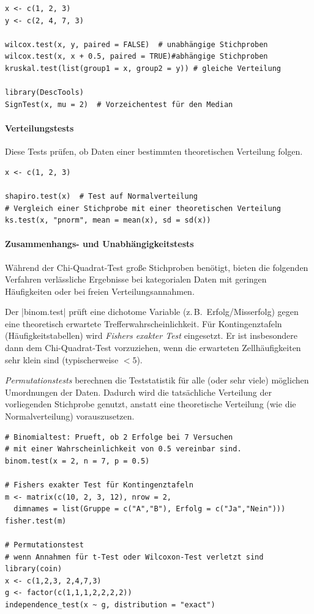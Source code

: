 \documentclass[10pt,twocolumn]{scrartcl}
\renewcommand{\lstinline}{\mycoloredinline}
\begin{document}
\begin{lstlisting}
x <- c(1, 2, 3)
y <- c(2, 4, 7, 3)

wilcox.test(x, y, paired = FALSE)  # unabhängige Stichproben
wilcox.test(x, x + 0.5, paired = TRUE)#abhängige Stichproben
kruskal.test(list(group1 = x, group2 = y)) # gleiche Verteilung

library(DescTools)
SignTest(x, mu = 2)  # Vorzeichentest für den Median
\end{lstlisting}

\paragraph{Verteilungstests}

Diese Tests prüfen, ob Daten einer bestimmten theoretischen Verteilung folgen.

\begin{lstlisting}
x <- c(1, 2, 3)

shapiro.test(x)  # Test auf Normalverteilung
# Vergleich einer Stichprobe mit einer theoretischen Verteilung
ks.test(x, "pnorm", mean = mean(x), sd = sd(x))
\end{lstlisting}

\paragraph{Zusammenhangs- und Unabhängigkeitstests}

Während der Chi-Quadrat-Test große Stichproben benötigt, bieten die folgenden Verfahren verlässliche Ergebnisse bei kategorialen Daten mit geringen Häufigkeiten oder bei freien Verteilungsannahmen.

Der \lstinline|binom.test| prüft eine dichotome Variable (z.\,B.\ Erfolg/Misserfolg) gegen eine theoretisch erwartete Trefferwahrscheinlichkeit. Für Kontingenztafeln (Häufigkeitstabellen) wird \emph{Fishers exakter Test} eingesetzt. Er ist insbesondere dann dem Chi-Quadrat-Test vorzuziehen, wenn die erwarteten Zellhäufigkeiten sehr klein sind (typischerweise $< 5$).

\emph{Permutationstests} berechnen die Teststatistik für alle (oder sehr viele) möglichen Umordnungen der Daten. Dadurch wird die tatsächliche Verteilung der vorliegenden Stichprobe genutzt, anstatt eine theoretische Verteilung (wie die Normalverteilung) vorauszusetzen.

\begin{lstlisting}
# Binomialtest: Prueft, ob 2 Erfolge bei 7 Versuchen 
# mit einer Wahrscheinlichkeit von 0.5 vereinbar sind.
binom.test(x = 2, n = 7, p = 0.5)

# Fishers exakter Test für Kontingenztafeln
m <- matrix(c(10, 2, 3, 12), nrow = 2,
  dimnames = list(Gruppe = c("A","B"), Erfolg = c("Ja","Nein")))
fisher.test(m)

# Permutationstest
# wenn Annahmen für t-Test oder Wilcoxon-Test verletzt sind
library(coin)
x <- c(1,2,3, 2,4,7,3)
g <- factor(c(1,1,1,2,2,2,2))
independence_test(x ~ g, distribution = "exact")
\end{lstlisting}
\end{document}
